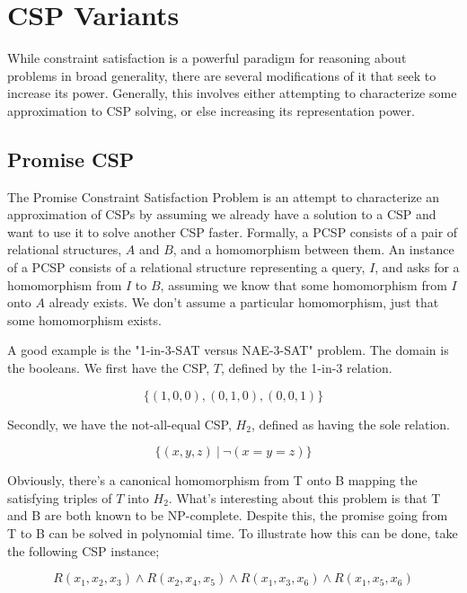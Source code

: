 \section{CSP Variants}\label{sec:variants}

While constraint satisfaction is a powerful paradigm for reasoning about problems in broad generality, there are several modifications of it that seek to increase its power. Generally, this involves either attempting to characterize some approximation to CSP solving, or else increasing its representation power. 

\subsection{Promise CSP}\label{sec:promise}

The Promise Constraint Satisfaction Problem is an attempt to characterize an approximation of CSPs by assuming we already have a solution to a CSP and want to use it to solve another CSP faster. Formally, a PCSP consists of a pair of relational structures, $A$ and $B$, and a homomorphism between them. An instance of a PCSP consists of a relational structure representing a query, $I$, and asks for a homomorphism from $I$ to $B$, assuming we know that some homomorphism from $I$ onto $A$ already exists. We don't assume a particular homomorphism, just that some homomorphism exists.

A good example is the "1-in-3-SAT versus NAE-3-SAT" problem. The domain is the booleans. We first have the CSP, $T$, defined by the 1-in-3 relation.

\begin{equation}
    \{(1, 0, 0), (0, 1, 0), (0, 0, 1)\}
\end{equation}

Secondly, we have the not-all-equal CSP, $H_2$, defined as having the sole relation.

\begin{equation}
   \{(x, y, z)\ |\ \neg (x = y = z) \}
\end{equation}

Obviously, there's a canonical homomorphism from T onto B mapping the satisfying triples of $T$ into $H_2$. What's interesting about this problem is that T and B are both known to be NP-complete. Despite this, the promise going from T to B can be solved in polynomial time. To illustrate how this can be done, take the following CSP instance;

\begin{equation}
    R(x_1, x_2, x_3) \wedge R(x_2, x_4, x_5) \wedge R(x_1, x_3, x_6) \wedge R(x_1, x_5, x_6)
\end{equation}

